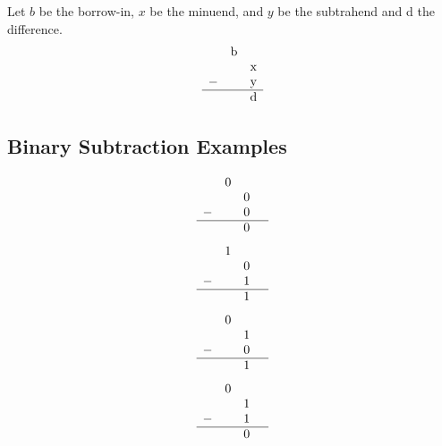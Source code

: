 \documentclass[12pt,openany, tikz,border=10pt]{book}
\begin{document}
			      	Let $b$ be the borrow-in, $x$ be the minuend, and $y$ be the subtrahend and d the difference. 
			      	\[
			      		\begin{array}{cccccc}
			      			&$b$ \\
			      			  &   & $x$ \\
			      			- &   & $y$ \\
			      			\hline
			      			  &   & $d$ \\
			      		\end{array}
			      	\]
			      	
			      	\subsection{Binary Subtraction Examples}
			      	
			      	
			      	
			      	\[
			      		\begin{array}{cccc}
			      			&0 & \\
			      			  &   & 0 &   \\
			      			- &   & 0 &   \\
			      			\hline
			      			  &   & 0 &   \\
			      		\end{array}
			      	\]
			      	\[
			      		\begin{array}{cccc}
			      			&1 & \\
			      			  &   & 0 &   \\
			      			- &   & 1 &   \\
			      			\hline
			      			  &   & 1 &   \\
			      		\end{array}
			      	\]
			      	\[
			      		\begin{array}{cccc}
			      			& 0 & \\
			      			  &   & 1 &   \\
			      			- &   & 0 &   \\
			      			\hline
			      			  &   & 1 &   \\
			      		\end{array}
			      	\]
			      	\[
			      		\begin{array}{cccc}
			      			& 0 & \\
			      			  &   & 1 &   \\
			      			- &   & 1 &   \\
			      			\hline
			      			  &   & 0 &   \\
			      		\end{array}
			      	\]
			      	
\end{document}
